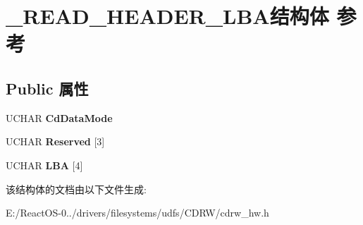 \hypertarget{struct___r_e_a_d___h_e_a_d_e_r___l_b_a}{}\section{\+\_\+\+R\+E\+A\+D\+\_\+\+H\+E\+A\+D\+E\+R\+\_\+\+L\+B\+A结构体 参考}
\label{struct___r_e_a_d___h_e_a_d_e_r___l_b_a}
\subsection*{Public 属性}
\begin{DoxyCompactItemize}
\item 
\mbox{\label{struct___r_e_a_d___h_e_a_d_e_r___l_b_a_a96aea5f81345fe87ab0dedc7e141c433}} 
U\+C\+H\+AR {\bfseries Cd\+Data\+Mode}
\item 
\mbox{\label{struct___r_e_a_d___h_e_a_d_e_r___l_b_a_a5a9e878749143e547987a528997a64f2}} 
U\+C\+H\+AR {\bfseries Reserved} \mbox{[}3\mbox{]}
\item 
\mbox{\label{struct___r_e_a_d___h_e_a_d_e_r___l_b_a_a7cb761cc86896f872b94e325363494ca}} 
U\+C\+H\+AR {\bfseries L\+BA} \mbox{[}4\mbox{]}
\end{DoxyCompactItemize}


该结构体的文档由以下文件生成\+:\begin{DoxyCompactItemize}
\item 
E\+:/\+React\+O\+S-\/0../drivers/filesystems/udfs/\+C\+D\+R\+W/cdrw\+\_\+hw.\+h\end{DoxyCompactItemize}
